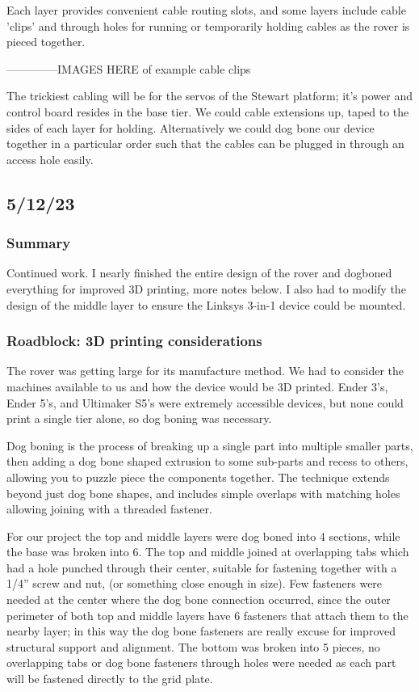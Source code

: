 \documentclass[a4paper, 10pt]{article}
\begin{document}
		Each layer provides convenient cable routing slots, and some layers include cable 'clips' and through holes for running or temporarily holding cables as the rover is pieced together.
		
		--------------IMAGES HERE of example cable clips 	
		
		The trickiest cabling will be for the servos of the Stewart platform; it's power and control board resides in the base tier. We could cable extensions up, taped to the sides of each layer for holding. Alternatively we could dog bone our device together in a particular order such that the cables can be plugged in through an access hole easily. 
			
	\subsection{5/12/23}
		\subsubsection{Summary}
		Continued work. I nearly finished the entire design of the rover and dogboned everything for improved 3D printing, more notes below. I also had to modify the design of the middle layer to ensure the Linksys 3-in-1 device could be mounted. 
			
		\subsubsection{Roadblock: 3D printing considerations}
		The rover was getting large for its manufacture method. We had to consider the machines available to us and how the device would be 3D printed. Ender 3's, Ender 5's, and Ultimaker S5's were extremely accessible devices, but none could print a single tier alone, so dog boning was necessary.	
		
		Dog boning is the process of breaking up a single part into multiple smaller parts, then adding a dog bone shaped extrusion to some sub-parts and recess to others, allowing you to puzzle piece the components together. The technique extends beyond just dog bone shapes, and includes simple overlaps with matching holes allowing joining with a threaded fastener.
		
		For our project the top and middle layers were dog boned into 4 sections, while the base was broken into 6. The top and middle joined at overlapping tabs which had a hole punched through their center, suitable for fastening together with a 1/4'' screw and nut, (or something close enough in size). Few fasteners were needed at the center where the dog bone connection occurred, since the outer perimeter of both top and middle layers have 6 fasteners that attach them to the nearby layer; in this way the dog bone fasteners are really excuse for improved structural support and alignment. The bottom was broken into 5 pieces, no overlapping tabs or dog bone fasteners through holes were needed as each part will be fastened directly to the grid plate.
		
\end{document}
